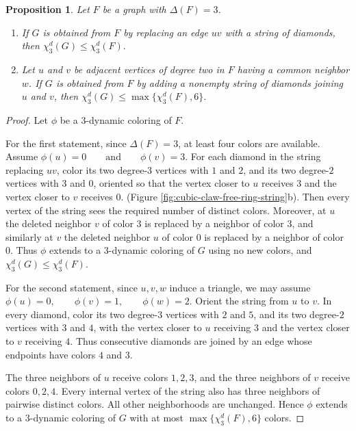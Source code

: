 \documentclass[10pt,a4paper]{article}
\newtheorem{proposition}[theorem] {Proposition}
\theoremstyle{case}
\numberwithin{subcase}{case}
\begin{document}
\begin{proposition}\label{prop:chi3Gleqchi3F}
Let $F$ be a graph with $\Delta(F)=3$.

\begin{enumerate}
    \item If $G$ is obtained from $F$ by replacing an edge $uv$ with a
    string of diamonds, then
    ${\chi_3^d(G)\leq \chi_3^d(F).}$
    \item Let $u$ and $v$ be adjacent vertices of degree two in $F$
    having a common neighbor $w$. If $G$ is obtained from $F$ by adding
    a nonempty string of diamonds joining $u$ and $v$, then
    $
        \chi_3^d(G)\leq \max\{\chi_3^d(F),6\}.
    $
\end{enumerate}
\end{proposition}

\begin{proof}
Let $\phi$ be a $3$-dynamic coloring of $F$.

For the first statement, since $\Delta(F)=3$, at least four colors are
available. Assume
$
\phi(u)=0
\qquad\text{and}\qquad
\phi(v)=3.
$
For each diamond in the string replacing $uv$, color its two degree-$3$
vertices with $1$ and $2$, and its two degree-$2$ vertices with $3$ and
$0$, oriented so that the vertex closer to $u$ receives $3$ and the
vertex closer to $v$ receives $0$.
(Figure \ref{fig:cubic-claw-free-ring-string}b).
Then every vertex of the string sees the required number of distinct
colors. Moreover, at $u$ the deleted neighbor $v$ of color $3$ is
replaced by a neighbor of color $3$, and similarly at $v$ the deleted
neighbor $u$ of color $0$ is replaced by a neighbor of color $0$.
Thus $\phi$ extends to a $3$-dynamic coloring of $G$ using no new
colors, and
$
\chi_3^d(G)\leq\chi_3^d(F).
$

For the second statement, 
since $u,v,w$ induce a triangle,
we may assume
$
\phi(u)=0,\qquad
\phi(v)=1,\qquad
\phi(w)=2.
$
Orient the string from $u$ to $v$. In every diamond, color its two
degree-$3$ vertices with $2$ and $5$, and its two degree-$2$ vertices
with $3$ and $4$, with the vertex closer to $u$ receiving $3$ and the
vertex closer to $v$ receiving $4$. Thus consecutive diamonds are
joined by an edge whose endpoints have colors $4$ and $3$.

The three neighbors of $u$ receive colors $1,2,3$, and the three
neighbors of $v$ receive colors $0,2,4$. Every internal vertex of the
string also has three neighbors of pairwise distinct colors. All other neighborhoods are unchanged.
Hence $\phi$ extends to a $3$-dynamic coloring of $G$ with at most
$\max\{\chi_3^d(F),6\}$ colors.
\end{proof}
\end{document}
